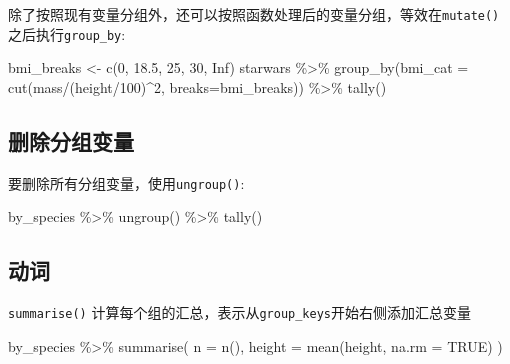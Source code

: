 \documentclass[
]{book}
\newenvironment{Shaded}{\begin{snugshade}}{\end{snugshade}}
\newcommand{\AttributeTok}[1]{\textcolor[rgb]{0.77,0.63,0.00}{#1}}
\newcommand{\ConstantTok}[1]{\textcolor[rgb]{0.00,0.00,0.00}{#1}}
\newcommand{\DecValTok}[1]{\textcolor[rgb]{0.00,0.00,0.81}{#1}}
\newcommand{\FloatTok}[1]{\textcolor[rgb]{0.00,0.00,0.81}{#1}}
\newcommand{\FunctionTok}[1]{\textcolor[rgb]{0.00,0.00,0.00}{#1}}
\newcommand{\NormalTok}[1]{#1}
\newcommand{\OtherTok}[1]{\textcolor[rgb]{0.56,0.35,0.01}{#1}}
\newcommand{\SpecialCharTok}[1]{\textcolor[rgb]{0.00,0.00,0.00}{#1}}
\begin{document}
除了按照现有变量分组外，还可以按照函数处理后的变量分组，等效在\texttt{mutate()}之后执行\texttt{group\_by}:

\begin{Shaded}
\begin{Highlighting}[]
\NormalTok{bmi\_breaks }\OtherTok{\textless{}{-}} \FunctionTok{c}\NormalTok{(}\DecValTok{0}\NormalTok{, }\FloatTok{18.5}\NormalTok{, }\DecValTok{25}\NormalTok{, }\DecValTok{30}\NormalTok{, }\ConstantTok{Inf}\NormalTok{)}
\NormalTok{starwars }\SpecialCharTok{\%\textgreater{}\%}
  \FunctionTok{group\_by}\NormalTok{(}\AttributeTok{bmi\_cat =} \FunctionTok{cut}\NormalTok{(mass}\SpecialCharTok{/}\NormalTok{(height}\SpecialCharTok{/}\DecValTok{100}\NormalTok{)}\SpecialCharTok{\^{}}\DecValTok{2}\NormalTok{, }\AttributeTok{breaks=}\NormalTok{bmi\_breaks)) }\SpecialCharTok{\%\textgreater{}\%}
  \FunctionTok{tally}\NormalTok{()}
\end{Highlighting}
\end{Shaded}

\hypertarget{ux5220ux9664ux5206ux7ec4ux53d8ux91cf}{%
\subsection{删除分组变量}\label{ux5220ux9664ux5206ux7ec4ux53d8ux91cf}}

要删除所有分组变量，使用\texttt{ungroup()}:

\begin{Shaded}
\begin{Highlighting}[]
\NormalTok{by\_species }\SpecialCharTok{\%\textgreater{}\%}
  \FunctionTok{ungroup}\NormalTok{() }\SpecialCharTok{\%\textgreater{}\%}
  \FunctionTok{tally}\NormalTok{()}
\end{Highlighting}
\end{Shaded}

\hypertarget{ux52a8ux8bcd}{%
\subsection{动词}\label{ux52a8ux8bcd}}

\texttt{summarise()} 计算每个组的汇总，表示从\texttt{group\_keys}开始右侧添加汇总变量

\begin{Shaded}
\begin{Highlighting}[]
\NormalTok{by\_species }\SpecialCharTok{\%\textgreater{}\%}
  \FunctionTok{summarise}\NormalTok{(}
    \AttributeTok{n =} \FunctionTok{n}\NormalTok{(),}
    \AttributeTok{height =} \FunctionTok{mean}\NormalTok{(height, }\AttributeTok{na.rm =} \ConstantTok{TRUE}\NormalTok{)}
\NormalTok{  )}
\end{Highlighting}
\end{Shaded}
\end{document}
